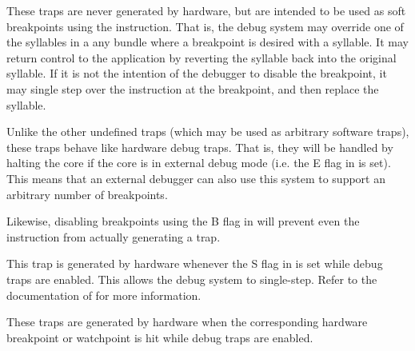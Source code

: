
\debug{}

These traps are never generated by hardware, but are intended to be used as soft
breakpoints using the  instruction. That is, the debug system may
override one of the syllables in a any bundle where a breakpoint is desired with
a  syllable. It may return control to the application by reverting
the  syllable back into the original syllable. If it is not the
intention of the debugger to disable the breakpoint, it may single step over
the instruction at the breakpoint, and then replace the  syllable.

Unlike the other undefined traps (which may be used as arbitrary software
traps), these traps behave like hardware debug traps. That is, they will be
handled by halting the core if the core is in external debug mode (i.e. the E
flag in  is set). This means that an external debugger can also use
this system to support an arbitrary number of breakpoints.

Likewise, disabling breakpoints using the B flag in  will prevent even
the  instruction from actually generating a trap.


\debug{}

This trap is generated by hardware whenever the S flag in  is set
while debug traps are enabled. This allows the debug system to single-step.
Refer to the documentation of  for more information.


\debug{}

These traps are generated by hardware when the corresponding hardware breakpoint
or watchpoint is hit while debug traps are enabled.

